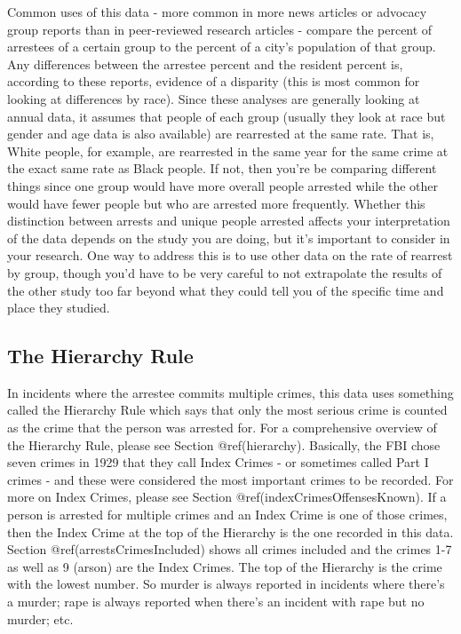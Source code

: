 \documentclass[
  12pt,
  openany]{book}
\begin{document}
Common uses of this data - more common in more news articles or advocacy group reports than in peer-reviewed research articles - compare the percent of arrestees of a certain group to the percent of a city's population of that group. Any differences between the arrestee percent and the resident percent is, according to these reports, evidence of a disparity (this is most common for looking at differences by race). Since these analyses are generally looking at annual data, it assumes that people of each group (usually they look at race but gender and age data is also available) are rearrested at the same rate. That is, White people, for example, are rearrested in the same year for the same crime at the exact same rate as Black people. If not, then you're be comparing different things since one group would have more overall people arrested while the other would have fewer people but who are arrested more frequently. Whether this distinction between arrests and unique people arrested affects your interpretation of the data depends on the study you are doing, but it's important to consider in your research. One way to address this is to use other data on the rate of rearrest by group, though you'd have to be very careful to not extrapolate the results of the other study too far beyond what they could tell you of the specific time and place they studied.

\hypertarget{the-hierarchy-rule}{%
\subsection{The Hierarchy Rule}\label{the-hierarchy-rule}}

In incidents where the arrestee commits multiple crimes, this data uses something called the Hierarchy Rule which says that only the most serious crime is counted as the crime that the person was arrested for. For a comprehensive overview of the Hierarchy Rule, please see Section @ref(hierarchy). Basically, the FBI chose seven crimes in 1929 that they call Index Crimes - or sometimes called Part I crimes - and these were considered the most important crimes to be recorded. For more on Index Crimes, please see Section @ref(indexCrimesOffensesKnown). If a person is arrested for multiple crimes and an Index Crime is one of those crimes, then the Index Crime at the top of the Hierarchy is the one recorded in this data. Section @ref(arrestsCrimesIncluded) shows all crimes included and the crimes 1-7 as well as 9 (arson) are the Index Crimes. The top of the Hierarchy is the crime with the lowest number. So murder is always reported in incidents where there's a murder; rape is always reported when there's an incident with rape but no murder; etc.
\end{document}
